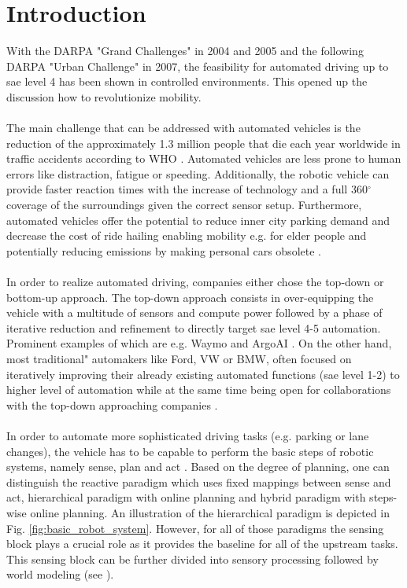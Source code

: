 \chapter{Introduction}
\label{ch:introduction}
With the DARPA "Grand Challenges" \cite{thrun2006stanley} in 2004 and 2005 and the following DARPA "Urban Challenge" \cite{Urmson-2007-9708} in 2007, the feasibility for automated driving up to \gls{sae} level 4 \cite{SAE2017} has been shown in controlled environments. This opened up the discussion how to revolutionize mobility. 
\\\\
The main challenge that can be addressed with automated vehicles is the reduction of the approximately 1.3 million people that die each year worldwide in traffic accidents according to WHO \cite{world2018global}. Automated vehicles are less prone to human errors like distraction, fatigue or speeding. Additionally, the robotic vehicle can provide faster reaction times with the increase of technology and a full 360$^{\circ}$ coverage of the surroundings given the correct sensor setup. Furthermore, automated vehicles offer the potential to reduce inner city parking demand \cite{zhang2020impacts} and decrease the cost of ride hailing enabling mobility e.g. for elder people and potentially reducing emissions by making personal cars obsolete \cite{severino2021autonomous}.  
\\\\
In order to realize automated driving, companies either chose the top-down or bottom-up approach. The top-down approach consists in over-equipping the vehicle with a multitude of sensors and compute power followed by a phase of iterative reduction and refinement to directly target \gls{sae} level 4-5 automation. Prominent examples of which are e.g. Waymo \cite{sun2020scalability} and ArgoAI \cite{chang2019argoverse}. On the other hand, most traditional" automakers like Ford, VW or BMW, often focused on iteratively improving their already existing automated functions (\gls{sae} level 1-2) to higher level of automation while at the same time being open for collaborations with the top-down approaching companies \cite{fordargovw2020}. 
\\\\
In order to automate more sophisticated driving tasks (e.g. parking or lane changes), the vehicle has to be capable to perform the basic steps of robotic systems, namely sense, plan and act \cite{arkin1998behavior}. Based on the degree of planning, one can distinguish the reactive paradigm which uses fixed mappings between sense and act, hierarchical paradigm with online planning and hybrid paradigm with steps-wise online planning. An illustration of the hierarchical paradigm is depicted in Fig. \ref{fig:basic_robot_system}. However, for all of those paradigms the sensing block plays a crucial role as it provides the baseline for all of the upstream tasks. This sensing block can be further divided into sensory processing followed by world modeling (see \cite{arkin1998behavior}).
